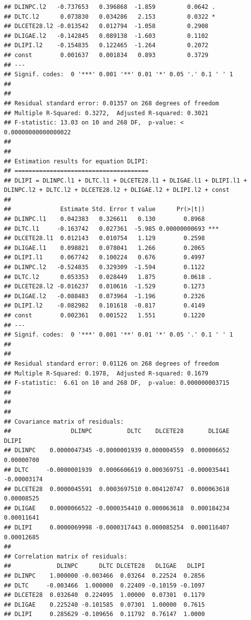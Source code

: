 \documentclass[
]{book}
\begin{document}
\begin{verbatim}
## DLINPC.l2   -0.737653   0.396868  -1.859         0.0642 .  
## DLTC.l2      0.073830   0.034286   2.153         0.0322 *  
## DLCETE28.l2 -0.013542   0.012794  -1.058         0.2908    
## DLIGAE.l2   -0.142845   0.089138  -1.603         0.1102    
## DLIPI.l2    -0.154835   0.122465  -1.264         0.2072    
## const        0.001637   0.001834   0.893         0.3729    
## ---
## Signif. codes:  0 '***' 0.001 '**' 0.01 '*' 0.05 '.' 0.1 ' ' 1
## 
## 
## Residual standard error: 0.01357 on 268 degrees of freedom
## Multiple R-Squared: 0.3272,  Adjusted R-squared: 0.3021 
## F-statistic: 13.03 on 10 and 268 DF,  p-value: < 0.00000000000000022 
## 
## 
## Estimation results for equation DLIPI: 
## ====================================== 
## DLIPI = DLINPC.l1 + DLTC.l1 + DLCETE28.l1 + DLIGAE.l1 + DLIPI.l1 + DLINPC.l2 + DLTC.l2 + DLCETE28.l2 + DLIGAE.l2 + DLIPI.l2 + const 
## 
##              Estimate Std. Error t value      Pr(>|t|)    
## DLINPC.l1    0.042383   0.326611   0.130        0.8968    
## DLTC.l1     -0.163742   0.027361  -5.985 0.00000000693 ***
## DLCETE28.l1  0.012143   0.010754   1.129        0.2598    
## DLIGAE.l1    0.098821   0.078041   1.266        0.2065    
## DLIPI.l1     0.067742   0.100224   0.676        0.4997    
## DLINPC.l2   -0.524835   0.329309  -1.594        0.1122    
## DLTC.l2      0.053353   0.028449   1.875        0.0618 .  
## DLCETE28.l2 -0.016237   0.010616  -1.529        0.1273    
## DLIGAE.l2   -0.088483   0.073964  -1.196        0.2326    
## DLIPI.l2    -0.082982   0.101618  -0.817        0.4149    
## const        0.002361   0.001522   1.551        0.1220    
## ---
## Signif. codes:  0 '***' 0.001 '**' 0.01 '*' 0.05 '.' 0.1 ' ' 1
## 
## 
## Residual standard error: 0.01126 on 268 degrees of freedom
## Multiple R-Squared: 0.1978,  Adjusted R-squared: 0.1679 
## F-statistic:  6.61 on 10 and 268 DF,  p-value: 0.000000003715 
## 
## 
## 
## Covariance matrix of residuals:
##                 DLINPC          DLTC    DLCETE28       DLIGAE       DLIPI
## DLINPC    0.0000047345 -0.0000001939 0.000004559  0.000006652  0.00000700
## DLTC     -0.0000001939  0.0006606619 0.000369751 -0.000035441 -0.00003174
## DLCETE28  0.0000045591  0.0003697510 0.004120747  0.000063618  0.00008525
## DLIGAE    0.0000066522 -0.0000354410 0.000063618  0.000184234  0.00011641
## DLIPI     0.0000069998 -0.0000317443 0.000085254  0.000116407  0.00012685
## 
## Correlation matrix of residuals:
##             DLINPC      DLTC DLCETE28   DLIGAE   DLIPI
## DLINPC    1.000000 -0.003466  0.03264  0.22524  0.2856
## DLTC     -0.003466  1.000000  0.22409 -0.10159 -0.1097
## DLCETE28  0.032640  0.224095  1.00000  0.07301  0.1179
## DLIGAE    0.225240 -0.101585  0.07301  1.00000  0.7615
## DLIPI     0.285629 -0.109656  0.11792  0.76147  1.0000
\end{verbatim}
\end{document}
